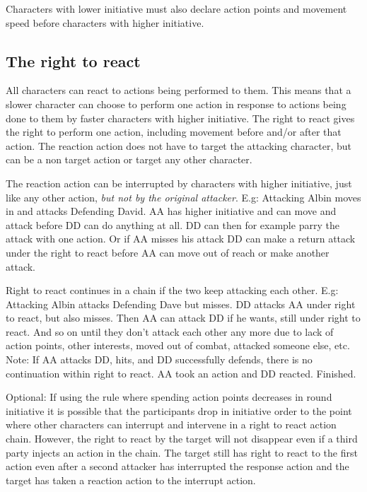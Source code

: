 Characters with lower initiative must also declare action points and movement speed before characters with higher initiative.


\subsection*{The right to react}
\label{righttoreact}
All characters can react to actions being performed to them. This means that a slower character can choose to perform one action in response to actions being done to them by faster characters with higher initiative.
The right to react gives the right to perform one action, including movement before and/or after that action. The reaction action does not have to target the attacking character, but can be a non target action or target any other character.

The reaction action can be interrupted by characters with higher initiative, just like any other action, \emph{but not by the original attacker}. 
E.g: Attacking Albin moves in and attacks Defending David. AA has higher initiative and can move and attack before DD can do anything at all. DD can then for example parry the attack with one action. Or if AA misses his attack DD can make a return attack under the right to react before AA can move out of reach or make another attack.

Right to react continues in a chain if the two keep attacking each other.
E.g: Attacking Albin attacks Defending Dave but misses. DD attacks AA under right to react, but also misses. Then AA can attack DD if he wants, still under right to react. And so on until they don't attack each other any more due to lack of action points, other interests, moved out of combat, attacked someone else, etc.\\
Note: If AA attacks DD, hits, and DD successfully defends, there is no continuation within right to react. AA took an action and DD reacted. Finished.

Optional: If using the rule where spending action points decreases in round initiative it is possible that the participants drop in initiative order to the point where other characters can interrupt and intervene in a right to react action chain. However, the right to react by the target will not disappear even if a third party injects an action in the chain. The target still has right to react to the first action even after a second attacker has interrupted the response action and the target has taken a reaction action to the interrupt action.

